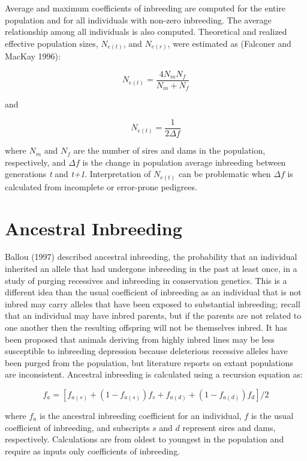 \documentclass[
  letterpaper,
  DIV=11,
  numbers=noendperiod]{scrreprt}
\begin{document}
Average and maximum coefficients of inbreeding are computed for the
entire population and for all individuals with non-zero inbreeding. The
average relationship among all individuals is also computed. Theoretical
and realized effective population sizes, \(N_{e(t)}\), and \(N_{e(r)}\),
were estimated as (Falconer and MacKay 1996):

\[ N_{e(t)} = \dfrac{ 4 N_m N_f } { N_m + N_f } \]

and

\[ N_{e(t)} = \dfrac{1}{2 \Delta f} \]

where \(N_m\) and \(N_f\) are the number of sires and dams in the
population, respectively, and \(\Delta f\) is the change in population
average inbreeding between generations \textit{t} and \textit{t+1}.
Interpretation of \(N_{e(t)}\) can be problematic when \(\Delta f\) is
calculated from incomplete or error-prone pedigrees.

\section{Ancestral
Inbreeding}\label{sec-methodology-ancestral-inbreeding}

Ballou (1997) described ancestral inbreeding, the probability that an
individual inherited an allele that had undergone inbreeding in the past
at least once, in a study of purging recessives and inbreeding in
conservation genetics. This is a different idea than the usual
coefficient of inbreeding as an individual that is not inbred may carry
alleles that have been exposed to substantial inbreeding; recall that an
individual may have inbred parents, but if the parents are not related
to one another then the resulting offspring will not be themselves
inbred. It has been proposed that animals deriving from highly inbred
lines may be less susceptible to inbreeding depression because
deleterious recessive alleles have been purged from the population, but
literature reports on extant populations are inconsistent. Ancestral
inbreeding is calculated using a recursion equation as:

\[ f_a = [f_{a(s)} + (1 - f_{a(s)})f_s + f_{a(d)} + (1 - f_{a(d)})f_d ]/2 \]

where \(f_a\) is the ancestral inbreeding coefficient for an individual,
\(f\) is the usual coefficient of inbreeding, and subscripts \(s\) and
\(d\) represent sires and dams, respectively. Calculations are from
oldest to youngest in the population and require as inputs only
coefficients of inbreeding.
\end{document}
